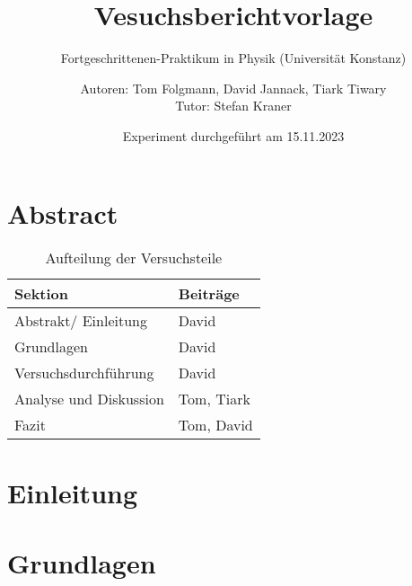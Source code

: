 \documentclass[
    oneside, 
    footinclude=off, 
    captions=tableheading, 
    DIV=12;usenames,
    dvipsnames
]{scrartcl}
\begin{document}
    \title{Vesuchsberichtvorlage}
    \subtitle{Fortgeschrittenen-Praktikum in Physik (Universität Konstanz)}
    \author{Autoren: Tom Folgmann, David Jannack, Tiark Tiwary \\ \large{Tutor: Stefan Kraner}}
    \date{Experiment durchgeführt am 15.11.2023}
    \maketitle
    \thispagestyle{empty}
    \section*{Abstract}
        

    \begin{table}[H]
        \centering
        \begin{tabular}{ll}
             Sektion & Beiträge \\\hline\hline
             Abstrakt/ Einleitung & David \\
             Grundlagen & David \\
             Versuchsdurchführung & David \\
             Analyse und Diskussion & Tom, Tiark \\
             Fazit & Tom, David
        \end{tabular}
        \caption{Aufteilung der Versuchsteile}
        \label{tab:Aufteilung}
    \end{table}

    \newpage


    \tableofcontents
    \thispagestyle{empty}	
    \newpage
    \setcounter{page}{1}


\newpage
\section{Einleitung}
        

\newpage
\section{Grundlagen}
    
\end{document}
